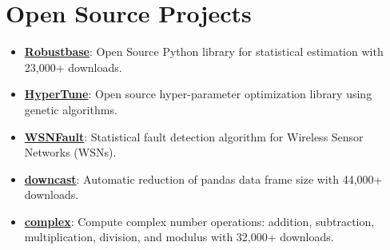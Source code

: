 \documentclass[letterpaper,11pt]{article}
\newcommand{\resumeItem}[2]{
  \item\small{
    \textbf{#1}{: #2 \vspace{-2pt}}
  }
}
\newcommand{\resumeSubItem}[2]{\resumeItem{#1}{#2}\vspace{-4pt}}
\newcommand{\resumeSubHeadingListStart}{\begin{itemize}[leftmargin=*]}
\newcommand{\resumeSubHeadingListEnd}{\end{itemize}}
\begin{document}
\section{Open Source Projects}
\resumeSubHeadingListStart
  \resumeSubItem{\href{https://github.com/deepak7376/robustbase}{Robustbase}}
    {Open Source Python library for statistical estimation with 23,000+ downloads.}
  \resumeSubItem{\href{https://github.com/deepak7376/HyperTune}{HyperTune}}
    {Open source hyper-parameter optimization library using genetic algorithms.}
  \resumeSubItem{\href{https://github.com/deepak7376/WSNFault}{WSNFault}}
    {Statistical fault detection algorithm for Wireless Sensor Networks (WSNs).}
  \resumeSubItem{\href{https://github.com/deepak7376/downcast}{downcast}}
    {Automatic reduction of pandas data frame size with 44,000+ downloads.}
  \resumeSubItem{\href{https://github.com/deepak7376/complex}{complex}}
    {Compute complex number operations: addition, subtraction, multiplication, division, and modulus with 32,000+ downloads.}
\resumeSubHeadingListEnd



\end{document}
